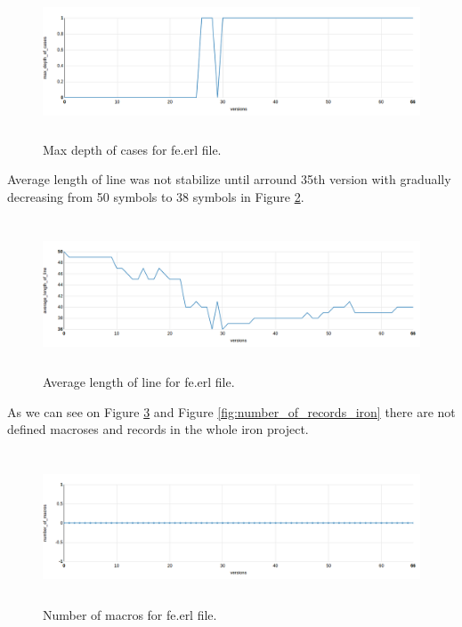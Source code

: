 \begin{figure}[h]
	\centering
	\includegraphics[height=45mm]{figures/max_depth_of_cases_iron.png}
	\caption{Max depth of cases for fe.erl file.}
	\label{fig:max_depth_of_cases_iron}
\end{figure}

Average length of line was not stabilize until arround 35th version with gradually decreasing from 50 symbols to 38 symbols in Figure \ref{fig:average_length_of_line_iron}.

\begin{figure}[h]
	\centering
	\includegraphics[height=45mm]{figures/average_length_of_line_iron.png}
	\caption{Average length of line for fe.erl file.}
	\label{fig:average_length_of_line_iron}
\end{figure}

As we can see on Figure \ref{fig:number_of_macros_iron} and Figure \ref{fig:number_of_records_iron} there are not defined macroses and records in the whole iron project.

\begin{figure}[h]
	\centering
	\includegraphics[height=45mm]{figures/number_of_macros_iron.png}
	\caption{Number of macros for fe.erl file.}
	\label{fig:number_of_macros_iron}
\end{figure}

